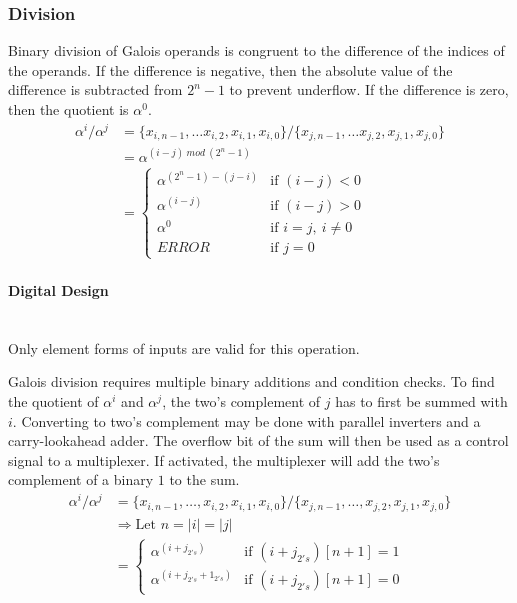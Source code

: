 \subsubsection{Division} Binary division of Galois operands is congruent to the
difference of the indices of the operands. If the difference is negative, then
the absolute value of the difference is subtracted from $2^{n}-1$ to prevent
underflow. If the difference is zero, then the quotient is $\alpha^{0}$.
    \begin{align*}
        \alpha^{i} / \alpha^{j} & = \{x_{i, n-1},\ldots x_{i, 2},x_{i,
        1},x_{i, 0}\} / \{x_{j, n-1}, \ldots x_{j, 2}, x_{j, 1}, x_{j, 0}\}
        \\
        & = \alpha^{(i - j) \ mod \ (2^{n}-1)} \\
        & = \begin{cases}
            \alpha^{(2^{n}-1) - (j - i)} & \text{if $(i - j) < 0$} \\
            \alpha^{(i - j)} & \text{if $(i - j) > 0$} \\
            \alpha^{0} & \text{if $i = j, \ i \neq 0$} \\
            ERROR & \text{if $j = 0$}
        \end{cases}
    \end{align*}

    \paragraph{{\small Digital Design}} \leavevmode \\ Only element forms of
    inputs are valid for this operation.

    Galois division requires multiple binary additions and condition checks. To
    find the quotient of $\alpha^{i}$ and $\alpha^{j}$, the two's complement of
    $j$ has to first be summed with $i$. Converting to two's complement may be
    done with parallel inverters and a carry-lookahead adder. The overflow bit
    of the sum will then be used as a control signal to a multiplexer. If
    activated, the multiplexer will add the two's complement of a binary $1$ to
    the sum.
\begin{align*}
    \alpha^{i} / \alpha^{j} & = \{ x_{i, n-1}, \ldots, x_{i, 2}, x_{i, 1},
    x_{i, 0} \} / \{x_{j, n-1}, \ldots, x_{j, 2}, x_{j, 1}, x_{j, 0}\} \\
    & \Longrightarrow \text{Let } n = |i| = |j| \\
    & = \begin{cases}
            \alpha^{(i + j_{2's})} & \text{if $(i+j_{2's})[n+1]=1$} \\
            \alpha^{(i + j_{2's} + 1_{2's})} & \text{if $(i+j_{2's})[n+1]=0$}
        \end{cases}
\end{align*}
